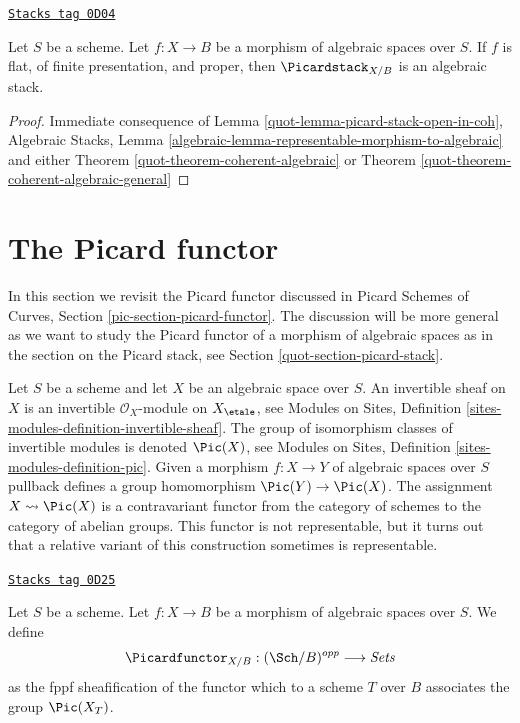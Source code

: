 \begin{proposition}[Pic]
\label{quot-proposition-pic}
\href{https://stacks.math.columbia.edu/tag/0D04}{\texttt{Stacks tag 0D04}}

Let $S$ be a scheme. Let $f : X \to B$ be a morphism of algebraic
spaces over $S$. If $f$ is flat, of finite presentation, and proper, then
$\Picardstack_{X/B}$ is an algebraic stack.
\end{proposition}

\begin{proof}

Immediate consequence of
Lemma \ref{quot-lemma-picard-stack-open-in-coh},
Algebraic Stacks, Lemma
\ref{algebraic-lemma-representable-morphism-to-algebraic}
and either
Theorem \ref{quot-theorem-coherent-algebraic}
or
Theorem \ref{quot-theorem-coherent-algebraic-general}
\end{proof}

\section{The Picard functor}
\label{quot-section-picard-functor}
In this section we revisit the Picard functor discussed in
Picard Schemes of Curves, Section \ref{pic-section-picard-functor}.
The discussion will be more general as we want to study
the Picard functor of a morphism of algebraic spaces as in
the section on the Picard stack, see Section \ref{quot-section-picard-stack}.

\medskip\noindent
Let $S$ be a scheme and let $X$ be an algebraic space over $S$.
An invertible sheaf on $X$ is an invertible $\mathcal{O}_X$-module
on $X_\etale$, see
Modules on Sites, Definition \ref{sites-modules-definition-invertible-sheaf}.
The group of isomorphism classes of invertible modules is denoted
$\Pic(X)$, see
Modules on Sites, Definition \ref{sites-modules-definition-pic}.
Given a morphism $f : X \to Y$ of algebraic spaces over $S$
pullback defines a group homomorphism $\Pic(Y) \to \Pic(X)$.
The assignment
$X \leadsto \Pic(X)$ is a contravariant functor from the category
of schemes to the category of abelian groups. This functor is not
representable, but it turns out that a relative variant of this
construction sometimes is representable.

\begin{definition}
\label{quot-situation-pic}
\href{https://stacks.math.columbia.edu/tag/0D25}{\texttt{Stacks tag 0D25}}

Let $S$ be a scheme.
Let $f : X \to B$ be a morphism of algebraic spaces over $S$.
We define
$$
\Picardfunctor_{X/B} : (\Sch/B)^{opp} \longrightarrow \textit{Sets}
$$
as the fppf sheafification of the functor which to a scheme $T$
over $B$ associates the group $\Pic(X_T)$.
\end{definition}

